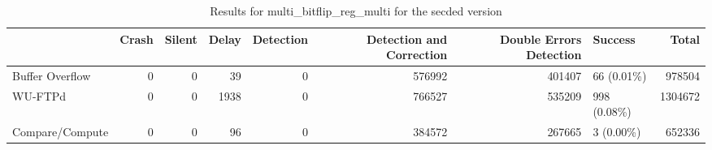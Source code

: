 \begin{table}[t]
	\centering
	\caption{Results for multi_bitflip_reg_multi for the secded version}
	\label{table:end_sim_by_status_secded_5_multi_bitflip_reg_multi}
	\begin{tabular}{lrrrrrrlr}
		\toprule
		                & Crash & Silent & Delay & Detection & Detection and Correction & Double Errors Detection & Success      & Total   \\
		\midrule
		Buffer Overflow & 0     & 0      & 39    & 0         & 576992                   & 401407                  & 66 (0.01\%)  & 978504  \\
		WU-FTPd         & 0     & 0      & 1938  & 0         & 766527                   & 535209                  & 998 (0.08\%) & 1304672 \\
		Compare/Compute & 0     & 0      & 96    & 0         & 384572                   & 267665                  & 3 (0.00\%)   & 652336  \\
		\bottomrule
	\end{tabular}
\end{table}
